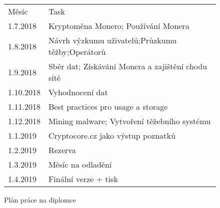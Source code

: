 \documentclass[
  printed, %
  table,   %
  nolof,     %
  nolot,     %
           oneside, color
]{fithesis3}
\begin{document}
\begin{figure}[H]
\center
\begin{tabular}{ll}
Měsíc     & Task                                              \\
1.7.2018  & Kryptoměna Monero; Používání Monera               \\
1.8.2018  & Návrh výzkumu uživatelů;Průzkumu těžby;Operátorů  \\
1.9.2018  & Sběr dat; Získávání Monera a zajištění chodu sítě \\
1.10.2018 & Vyhodnocení dat                                   \\
1.11.2018 & Best practices pro usage a storage                \\
1.12.2018 & Mining malware; Vytvoření těžebního systému       \\
1.1.2019  & Cryptocore.cz jako výstup poznatků                \\
1.2.2019  & Rezerva                                           \\
1.3.2019  & Měsíc na odladění                                 \\
1.4.2019  & Finální verze + tisk                             
\end{tabular}
\caption{Plán práce na diplomce}
\label{ssme-thesis-plan}
\end{figure}



\printbibliography[heading=bibintoc]

\end{document}
